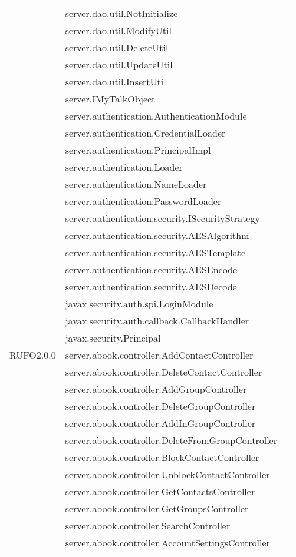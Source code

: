 \begin{center}
\begin{longtable}{lp{}l}
& server.dao.util.NotInitialize\\
& server.dao.util.ModifyUtil\\
& server.dao.util.DeleteUtil\\
& server.dao.util.UpdateUtil\\
& server.dao.util.InsertUtil\\
& server.IMyTalkObject\\
& server.authentication.AuthenticationModule\\
& server.authentication.CredentialLoader\\
& server.authentication.PrincipalImpl\\
& server.authentication.Loader\\
& server.authentication.NameLoader\\
& server.authentication.PasswordLoader\\
& server.authentication.security.ISecurityStrategy\\
& server.authentication.security.AESAlgorithm\\
& server.authentication.security.AESTemplate\\
& server.authentication.security.AESEncode\\
& server.authentication.security.AESDecode\\
& javax.security.auth.spi.LoginModule\\
& javax.security.auth.callback.CallbackHandler\\
& javax.security.Principal\\
RUFO2.0.0 & server.abook.controller.AddContactController\\
& server.abook.controller.DeleteContactController\\
& server.abook.controller.AddGroupController\\
& server.abook.controller.DeleteGroupController\\
& server.abook.controller.AddInGroupController\\
& server.abook.controller.DeleteFromGroupController\\
& server.abook.controller.BlockContactController\\
& server.abook.controller.UnblockContactController\\
& server.abook.controller.GetContactsController\\
& server.abook.controller.GetGroupsController\\
& server.abook.controller.SearchController\\
& server.abook.controller.AccountSettingsController\\

\end{longtable}
\end{center}
